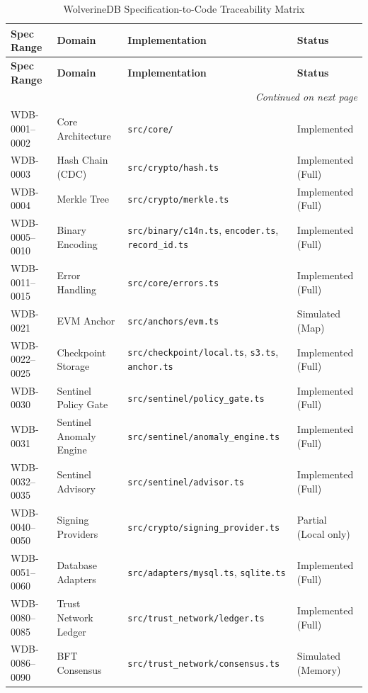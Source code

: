 \begin{longtable}{p{} p{} p{} p{}}
\caption{WolverineDB Specification-to-Code Traceability Matrix} \label{tab:app-wdb-full-mapping} \\
\toprule
\textbf{Spec Range} & \textbf{Domain} & \textbf{Implementation} & \textbf{Status} \\
\midrule
\endfirsthead
\toprule
\textbf{Spec Range} & \textbf{Domain} & \textbf{Implementation} & \textbf{Status} \\
\midrule
\endhead
\midrule
\multicolumn{4}{r}{\textit{Continued on next page}} \\
\endfoot
\bottomrule
\endlastfoot

WDB-0001--0002 & Core Architecture & \texttt{src/core/} & Implemented \\
WDB-0003 & Hash Chain (CDC) & \texttt{src/crypto/hash.ts} & Implemented (Full) \\
WDB-0004 & Merkle Tree & \texttt{src/crypto/merkle.ts} & Implemented (Full) \\
WDB-0005--0010 & Binary Encoding & \texttt{src/binary/c14n.ts}, \texttt{encoder.ts}, \texttt{record\_id.ts} & Implemented (Full) \\
WDB-0011--0015 & Error Handling & \texttt{src/core/errors.ts} & Implemented (Full) \\
\midrule
WDB-0021 & EVM Anchor & \texttt{src/anchors/evm.ts} & Simulated (Map) \\
WDB-0022--0025 & Checkpoint Storage & \texttt{src/checkpoint/local.ts}, \texttt{s3.ts}, \texttt{anchor.ts} & Implemented (Full) \\
\midrule
WDB-0030 & Sentinel Policy Gate & \texttt{src/sentinel/policy\_gate.ts} & Implemented (Full) \\
WDB-0031 & Sentinel Anomaly Engine & \texttt{src/sentinel/anomaly\_engine.ts} & Implemented (Full) \\
WDB-0032--0035 & Sentinel Advisory & \texttt{src/sentinel/advisor.ts} & Implemented (Full) \\
\midrule
WDB-0040--0050 & Signing Providers & \texttt{src/crypto/signing\_provider.ts} & Partial (Local only) \\
WDB-0051--0060 & Database Adapters & \texttt{src/adapters/mysql.ts}, \texttt{sqlite.ts} & Implemented (Full) \\
\midrule
WDB-0080--0085 & Trust Network Ledger & \texttt{src/trust\_network/ledger.ts} & Implemented (Full) \\
WDB-0086--0090 & BFT Consensus & \texttt{src/trust\_network/consensus.ts} & Simulated (Memory) \\

\end{longtable}
